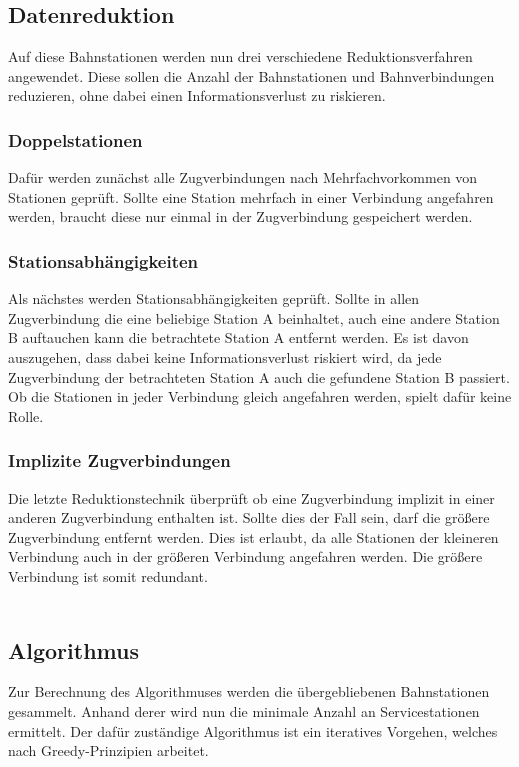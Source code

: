 \subsection{Datenreduktion}\label{subsubsec:datenreduktion}
Auf diese Bahnstationen werden nun drei verschiedene Reduktionsverfahren angewendet. Diese sollen die Anzahl der Bahnstationen und Bahnverbindungen reduzieren, ohne dabei einen Informationsverlust zu riskieren.\\ 

\subsubsection{Doppelstationen}\label{subsubsec:doppelstationen}
Dafür werden zunächst alle Zugverbindungen nach Mehrfachvorkommen von Stationen geprüft. Sollte eine Station mehrfach in einer Verbindung angefahren werden, braucht diese nur einmal in der Zugverbindung gespeichert werden.

\subsubsection{Stationsabhängigkeiten}\label{subsubsec:stationsabhaengigkeiten}
Als nächstes werden Stationsabhängigkeiten geprüft. Sollte in allen Zugverbindung die eine beliebige Station A beinhaltet, auch eine andere Station B auftauchen kann die betrachtete Station A entfernt werden. Es ist davon auszugehen, dass dabei keine Informationsverlust riskiert wird, da jede Zugverbindung der betrachteten Station A auch die gefundene Station B passiert. Ob die Stationen in jeder Verbindung gleich angefahren werden, spielt dafür keine Rolle.

\subsubsection{Implizite Zugverbindungen}\label{subsubsec:implizite-zugverbindungen}
Die letzte Reduktionstechnik überprüft ob eine Zugverbindung implizit in einer anderen Zugverbindung enthalten ist. Sollte dies der Fall sein, darf die größere Zugverbindung entfernt werden. Dies ist erlaubt, da alle Stationen der kleineren Verbindung auch in der größeren Verbindung angefahren werden. Die größere Verbindung ist somit redundant.\\
\\
\subsection{Algorithmus}\label{subsec:algorithmus}
Zur Berechnung des Algorithmuses werden die übergebliebenen Bahnstationen gesammelt. Anhand derer wird nun die minimale Anzahl an Servicestationen ermittelt. Der dafür zuständige Algorithmus ist ein iteratives Vorgehen, welches nach Greedy-Prinzipien arbeitet.\\
\\
